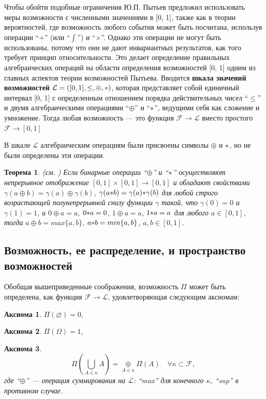 \documentclass[a4paper, 14pt]{extarticle}
\newcommand\ptime{\ding{42}}
\newcommand{\pplus}{\oplus}
\newtheorem{theorem}{Теорема}
\newtheorem{axiom}{Аксиома}
\begin{document}
Чтобы обойти подобные ограничения Ю.П. Пытьев предложил использовать меры возможности с численными значениями в [0, 1], также как в теории вероятностей, где возможность любого события может быть посчитана, используя операции ``+'' (или ``$\int$'') и ``$\times$''. Однако эти операции не могут быть использованы, потому что они не дают инвариантных результатов, как того требует принцип относительности. Это делает определение правильных алгебраических операций на  области определения возможностей [0, 1] одним из главных аспектов теории возможностей Пытьева. Вводится \textbf{шкала значений возможностей} $\mathcal{L} = ([0, 1], \leq, \oplus, \ptime)$, которая представляет собой единичный интервал [0, 1] с определенным отношением порядка действительных чисел ``$\leq$'' и двумя алгебраическими операциями ``$\oplus$'' и ``$\ptime$'', ведущими себя как сложение и умножение. Тогда любая возможность --- это функция $\mathcal{F}\to\mathcal{L}$ вместо простого $\mathcal{F}\to[0, 1]$

В шкале $\mathcal{L}$ алгебраическим операциям были присвоены символы $\oplus$ и $\ptime$, но не были определены эти операции.


\begin{theorem} \label{t1}
(см. \cite{pyt2007possibility}) Если бинарные операции ``$\oplus$'' и ``$\ptime$'' осуществляют непрерывное отображение $[0, 1]\times[0,1]\rightarrow[0,1]$ и обладают свойствами $\gamma(a \oplus b) = \gamma(a) \oplus \gamma(b)$, $\gamma(a \ptime b) = \gamma(a) \ptime \gamma(b)$ для любой строго возрастающей полунепрерывной снизу функции $\gamma$ такой, что $\gamma(0) = 0$ и $\gamma(1) = 1$, и $0 \oplus a = a$, $0 \ptime a = 0$, $1 \oplus a = a$, $1 \ptime a = a$ для любого $a \in [0,1]$, тогда $a \oplus b = max\{a, b\}$, $a \ptime b = min\{a, b\}$, $a, b \in [0, 1]$.  
\end{theorem}

\subsection{Возможность, ее распределение, и пространство возможностей}
Обобщая вышеприведенные соображения, возможность $\Pi$ может быть определена, как функция $\mathcal{F}\to\mathcal{L}$, удовлетворяющая следующим аксиомам:
\begin{axiom}
 $\Pi(\varnothing) = 0,$
\end{axiom}
\begin{axiom}
$\Pi(\Omega) = 1,$
\end{axiom}
\begin{axiom}
\[
\Pi(\bigcup_{A\in\kappa} A) = \underset{A\in\kappa}\pplus \Pi(A) \quad \forall \kappa \subset \mathcal{F},
\]
где ``$\pplus$'' --- операция суммирования на $\mathcal{L}$: ``max'' для конечного $\kappa$, ``sup'' в противном случае.
\end{axiom}
\end{document}
